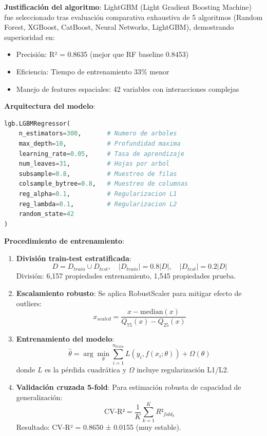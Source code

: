 \textbf{Justificación del algoritmo}: LightGBM (Light Gradient Boosting Machine) fue seleccionado tras evaluación comparativa exhaustiva de 5 algoritmos (Random Forest, XGBoost, CatBoost, Neural Networks, LightGBM), demostrando superioridad en:
\begin{itemize}
    \item Precisión: R² = 0.8635 (mejor que RF baseline 0.8453)
    \item Eficiencia: Tiempo de entrenamiento 33\% menor
    \item Manejo de features espaciales: 42 variables con interacciones complejas
\end{itemize}

\textbf{Arquitectura del modelo}:
\begin{lstlisting}[language=Python, caption=Configuración LightGBM]
lgb.LGBMRegressor(
    n_estimators=300,       # Numero de arboles
    max_depth=10,           # Profundidad maxima
    learning_rate=0.05,     # Tasa de aprendizaje
    num_leaves=31,          # Hojas por arbol
    subsample=0.8,          # Muestreo de filas
    colsample_bytree=0.8,   # Muestreo de columnas
    reg_alpha=0.1,          # Regularizacion L1
    reg_lambda=0.1,         # Regularizacion L2
    random_state=42
)
\end{lstlisting}

\textbf{Procedimiento de entrenamiento}:

\begin{enumerate}
    \item \textbf{División train-test estratificada}:
    \begin{equation}
    D = D_{train} \cup D_{test}, \quad |D_{train}| = 0.8|D|, \quad |D_{test}| = 0.2|D|
    \end{equation}
    División: 6,157 propiedades entrenamiento, 1,545 propiedades prueba.
    
    \item \textbf{Escalamiento robusto}: Se aplica RobustScaler para mitigar efecto de outliers:
    \begin{equation}
    x_{scaled} = \frac{x - \text{median}(x)}{Q_{75}(x) - Q_{25}(x)}
    \end{equation}
    
    \item \textbf{Entrenamiento del modelo}:
    \begin{equation}
    \hat{\theta} = \arg\min_{\theta} \sum_{i=1}^{n_{train}} L(y_i, f(x_i; \theta)) + \Omega(\theta)
    \end{equation}
    donde $L$ es la pérdida cuadrática y $\Omega$ incluye regularización L1/L2.
    
    \item \textbf{Validación cruzada 5-fold}: Para estimación robusta de capacidad de generalización:
    \begin{equation}
    \text{CV-R²} = \frac{1}{K}\sum_{k=1}^{K} R²_{fold_k}
    \end{equation}
    Resultado: CV-R² = 0.8650 ± 0.0155 (muy estable).
\end{enumerate}

